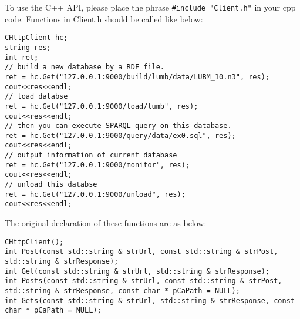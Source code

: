 \documentclass[titlepage, a4paper, 12pt]{article}
\begin{document}



To use the C++ API, please place the phrase \texttt{\#include\ "Client.h"} in your cpp code. Functions in Client.h should be called like below:

\begin{verbatim}
CHttpClient hc;
string res; 
int ret;
// build a new database by a RDF file.
ret = hc.Get("127.0.0.1:9000/build/lumb/data/LUBM_10.n3", res);
cout<<res<<endl;
// load databse
ret = hc.Get("127.0.0.1:9000/load/lumb", res);
cout<<res<<endl;
// then you can execute SPARQL query on this database.
ret = hc.Get("127.0.0.1:9000/query/data/ex0.sql", res);
cout<<res<<endl;
// output information of current database
ret = hc.Get("127.0.0.1:9000/monitor", res);
cout<<res<<endl;
// unload this databse
ret = hc.Get("127.0.0.1:9000/unload", res);
cout<<res<<endl;
\end{verbatim}

The original declaration of these functions are as below:

\begin{verbatim}
CHttpClient();
int Post(const std::string & strUrl, const std::string & strPost, std::string & strResponse);
int Get(const std::string & strUrl, std::string & strResponse);
int Posts(const std::string & strUrl, const std::string & strPost, std::string & strResponse, const char * pCaPath = NULL);
int Gets(const std::string & strUrl, std::string & strResponse, const char * pCaPath = NULL);
\end{verbatim}



\end{document}
